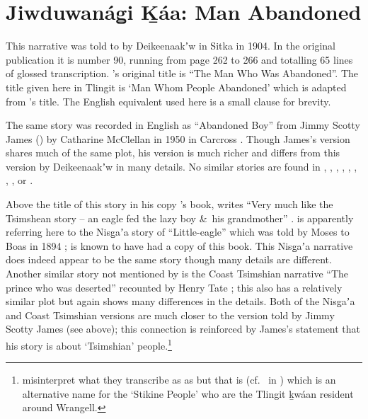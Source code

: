 
\resetexcnt
\chapter{Jiwduwanág̱i Ḵáa: Man Abandoned}\label{ch:90-man-abandoned}

This narrative was told to \citeauthor{swanton:1909} by Deikeenaakʼw in Sitka in 1904.
In the original publication it is number 90, running from page 262 to 266 and totalling 65 lines of glossed transcription.
\citeauthor{swanton:1909}’s original title is “The Man Who Was Abandoned”.
The title given here in Tlingit is  ‘Man Whom People Abandoned’ which is adapted from \citeauthor{swanton:1909}’s title.
The English equivalent used here is a small clause for brevity.

The same story was recorded in English as “Abandoned Boy” from  Jimmy Scotty James () by Catharine McClellan in 1950 in Carcross \parencite[384–390]{mcclellan-cruikshank:2007b}.
Though James’s version shares much of the same plot, his version is much richer and differs from this version by Deikeenaakʼw in many details.
No similar stories are found in \textcite{veniaminov:1846}, \textcite{judson:1911}, \textcite{jones:1914}, \textcites{velten:1939}{velten:1944}, \textcite{salisbury:1962}, \textcite{olson:1967}, \textcite{de-laguna:1972}, \textcite{dauenhauer:1987}, or \textcite{emmons:1991}.

Above the title of this story in his copy \citeauthor{swanton:1909}’s book, \citeauthor{paul:1930} writes “Very much like the Tsimshean story – an eagle fed the lazy boy \&\ his grandmother” \parencite[262]{paul:1930}.
\citeauthor{paul:1930} is apparently referring here to the Nisg̱aʼa story of “Little-eagle” which was told by Moses to Boas in 1894 \parencite[169–187]{boas:1902}; \citeauthor{paul:1930} is known to have had a copy of this book.
This Nisg̱aʼa narrative does indeed appear to be the same story though many details are different.
Another similar story not mentioned by \citeauthor{paul:1930} is the Coast Tsimshian narrative “The prince who was deserted” recounted by Henry Tate \parencite[225–232]{boas:1916}; this also has a relatively similar plot but again shows many differences in the details.
Both of the Nisg̱aʼa and Coast Tsimshian versions are much closer to the version told by Jimmy Scotty James (see above); this connection is reinforced by James’s statement that his story is about  ‘Tsimshian’ people.\footnote{\textcite[384]{mcclellan-cruikshank:2007b} misinterpret what they transcribe as  as  but that is  (cf.\  in \cite[396]{swanton:1908}) which is an alternative name for the  ‘Stikine People’ who are the Tlingit ḵwáan resident around Wrangell.} 

